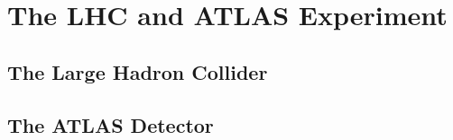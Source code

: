 \chapter{The LHC and ATLAS Experiment}

\section{The Large Hadron Collider}

\section{The ATLAS Detector}

